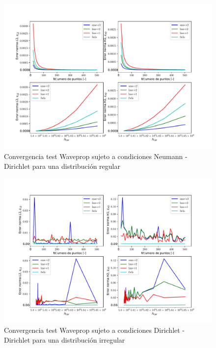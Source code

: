 \begin{figure}
    \centering
    \includegraphics[width=1\textwidth]{./Imagenes/06/comparacion_shp_regular/Waveprop_regular_type-2_caso-3_direct_dgesv-lapack-blas_sme-v2_lme-v2_lme-v1_fwls.pdf}
    \caption{Convergencia test Waveprop sujeto a condiciones Neumann - Dirichlet para una distribución regular} \label{fig:Waveprop_caso-3_conv}
\end{figure}
\begin{figure}
    \centering
    \includegraphics[width=1\textwidth]{./Imagenes/06/comparacion_shp_irreg/Waveprop_irreg_type-2_caso-1_direct_dgesv-lapack-blas_sme-v2_lme-v2_lme-v1_fwls.pdf}
    \caption{Convergencia test Waveprop sujeto a condiciones Dirichlet - Dirichlet para una distribución irregular} \label{fig:Waveprop_caso-1_conv_irreg}
\end{figure}
